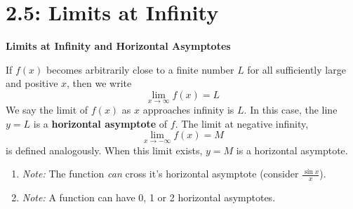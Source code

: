 \documentclass[../mathNotesPreamble]{subfiles}
\begin{document}
\section{2.5: Limits at Infinity} 
      \begin{defn*}
        \textbf{Limits at Infinity and Horizontal Asymptotes} 

          If $f(x)$ becomes arbitrarily close to a finite number $L$ for all sufficiently large and positive $x$, then we write
            $$\lim_{x \to \infty} f(x)=L$$
          We say the limit of $f(x)$ as $x$ approaches infinity is $L$. In this case, the line $y=L$ is a \textbf{horizontal asymptote} of $f$. The limit at negative infinity, 
            $$\lim_{x \to -\infty} f(x)=M$$
          is defined analogously. When this limit exists, $y=M$ is a horizontal asymptote.
      \end{defn*}
      \begin{enumerate}[label=]
        \item\textit{Note:} The function \textit{can} cross it's horizontal asymptote (consider $\frac{\sin x}{x}$).
        \item\textit{Note:} A function can have 0, 1 or 2 horizontal asymptotes.
      \end{enumerate}
      
\end{document}
